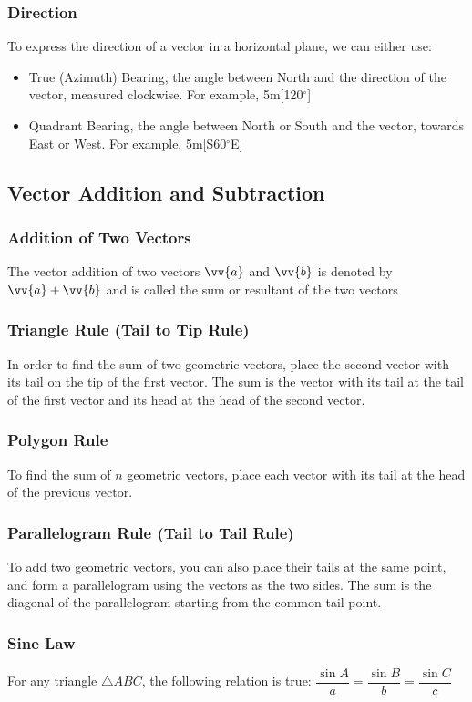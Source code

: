 \documentclass{article}
\begin{document}
	\subsubsection{Direction}
	To express the direction of a vector in a horizontal plane, we can either use:
	\begin{itemize}
		\item True (Azimuth) Bearing, the angle between North and the direction of the vector, measured clockwise. For example, 5m[120$^\circ$]
		\item Quadrant Bearing, the angle between North or South and the vector, towards East or West. For example, 5m[S60$^\circ$E]
	\end{itemize}
	\subsection{Vector Addition and Subtraction}
	\subsubsection{Addition of Two Vectors}
	The vector addition of two vectors $\vv{a}$ and $\vv{b}$ is denoted by $\vv{a}+\vv{b}$ and is called the sum or resultant of the two vectors
	\subsubsection{Triangle Rule (Tail to Tip Rule)}
	In order to find the sum of two geometric vectors, place the second vector with its tail on the tip of the first vector. The sum is the vector with its tail at the tail of the first vector and its head at the head of the second vector.
	\subsubsection{Polygon Rule}
	To find the sum of $n$ geometric vectors, place each vector with its tail at the head of the previous vector.
	\subsubsection{Parallelogram Rule (Tail to Tail Rule)}
	To add two geometric vectors, you can also place their tails at the same point, and form a parallelogram using the vectors as the two sides. The sum is the diagonal of the parallelogram starting from the common tail point.
	\subsubsection{Sine Law}
	For any triangle $\triangle ABC$, the following relation is true: $\dfrac{\sin A}{a}=\dfrac{\sin B}{b}=\dfrac{\sin C}{c}$
\end{document}
